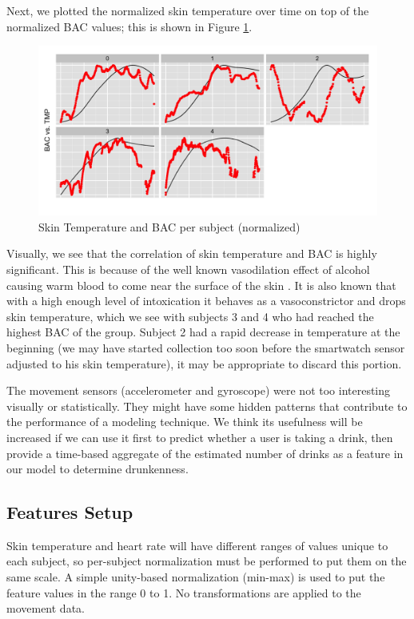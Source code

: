 Next, we plotted the normalized skin temperature over time on top of the normalized BAC values; this is shown in Figure \ref{fig:skin_temperatures}. \begin{figure}
	\includegraphics[width=1.0\textwidth]{../figs/skin_temperatures}
	\caption{Skin Temperature and BAC per subject (normalized)}
	\label{fig:skin_temperatures}
\end{figure}Visually, we see that the correlation of skin temperature and BAC is highly significant. This is because of the well known vasodilation effect of alcohol causing warm blood to come near the surface of the skin \cite{Dekker:1999}. It is also known that with a high enough level of intoxication it behaves as a vasoconstrictor and drops skin temperature, which we see with subjects 3 and 4 who had reached the highest BAC of the group. Subject 2 had a rapid decrease in temperature at the beginning (we may have started collection too soon before the smartwatch sensor adjusted to his skin temperature), it may be appropriate to discard this portion.

The movement sensors (accelerometer and gyroscope) were not too interesting visually or statistically. They might have some hidden patterns that contribute to the performance of a modeling technique. We think its usefulness will be increased if we can use it first to predict whether a user is taking a drink, then provide a time-based aggregate of the estimated number of drinks as a feature in our model to determine drunkenness.

\subsection{Features Setup}

Skin temperature and heart rate will have different ranges of values unique to each subject, so per-subject normalization must be performed to put them on the same scale. A simple unity-based normalization (min-max) is used to put the feature values in the range 0 to 1. No transformations are applied to the movement data.

